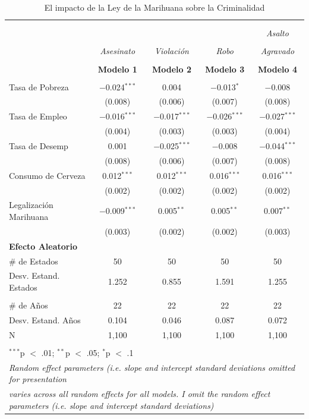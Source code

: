 \documentclass[11pt,]{article}
\begin{document}
\begin{table}[!htbp] \centering 
  \caption{El impacto de la Ley de la Marihuana sobre la Criminalidad} 
  \label{tab:mdl} 
\small 
\begin{tabular}{@{\extracolsep{5pt}}lcccc} 
\\[-1.8ex]\hline \\[-1.8ex] 
\\[-1.8ex] &  &  &  & \emph{Asalto} \\
\\[-1.8ex] & \emph{Asesinato} & \emph{Violación} & \emph{Robo} & \emph{Agravado}\\ 
\\[-1.8ex] & \textbf{Modelo 1} & \textbf{Modelo 2} & \textbf{Modelo 3} & \textbf{Modelo 4}\\ 
\hline \\[-1.8ex] 
 Tasa de Pobreza & $-$0.024$^{***}$ & 0.004 & $-$0.013$^{*}$ & $-$0.008 \\ 
  & (0.008) & (0.006) & (0.007) & (0.008) \\ 
  Tasa de Empleo & $-$0.016$^{***}$ & $-$0.017$^{***}$ & $-$0.026$^{***}$ & $-$0.027$^{***}$ \\ 
  & (0.004) & (0.003) & (0.003) & (0.004) \\ 
  Tasa de Desemp & 0.001 & $-$0.025$^{***}$ & $-$0.008 & $-$0.044$^{***}$ \\ 
  & (0.008) & (0.006) & (0.007) & (0.008) \\ 
  Consumo de Cerveza & 0.012$^{***}$ & 0.012$^{***}$ & 0.016$^{***}$ & 0.016$^{***}$ \\ 
  & (0.002) & (0.002) & (0.002) & (0.002) \\ 
  Legalización Marihuana & $-$0.009$^{***}$ & 0.005$^{**}$ & 0.005$^{**}$ & 0.007$^{**}$ \\ 
  & (0.003) & (0.002) & (0.002) & (0.003) \\ 
\hline
{\bf Efecto Aleatorio} & & & &  \\
\hline
\# de Estados & 50 & 50 & 50 & 50 \\
Desv. Estand. Estados &  1.252 & 0.855 & 1.591 & 1.255 \\
\\
\# de Años & 22 & 22 & 22 & 22 \\
Desv. Estand. Años &  0.104 & 0.046 & 0.087 & 0.072 \\
\hline
 N & 1,100 & 1,100 & 1,100 & 1,100 \\ 
\hline \\[-1.8ex] 
\multicolumn{5}{l}{$^{***}$p $<$ .01; $^{**}$p $<$ .05; $^{*}$p $<$ .1} \\ 
\multicolumn{5}{l}{\scriptsize \emph{Random effect parameters (i.e. slope and intercept standard deviations omitted for presentation}} \\ 
\multicolumn{5}{l}{\footnotesize \emph{varies across all random effects for all models. I omit the random effect parameters (i.e. slope and intercept standard deviations)}} \\ 
\end{tabular} 
\end{table}
\end{document}
